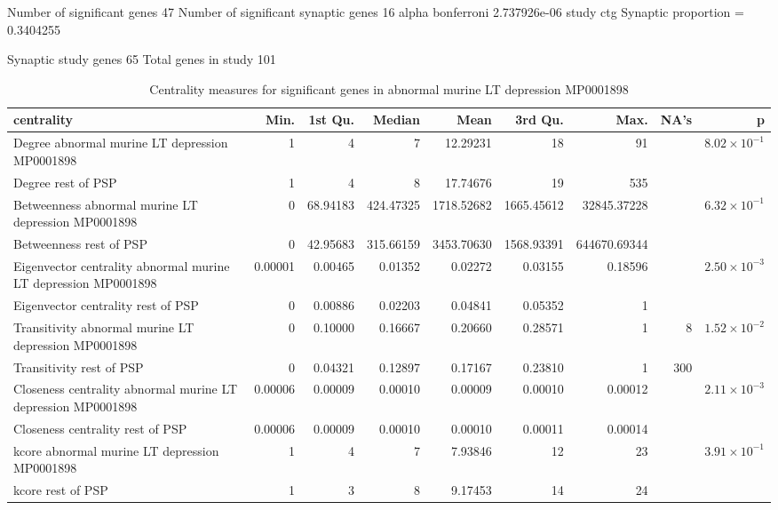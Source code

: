 Number of significant genes 47  
Number of significant synaptic genes 16  
alpha bonferroni 2.737926e-06  
study  ctg 
Synaptic proportion =  0.3404255 

Synaptic study genes  65
Total genes in study 101%
\begin{table}[ht]
\centering
\begin{adjustbox}{width=\textwidth}

\begin{tabular}{lrrrrrrrr}
  \hline
centrality & Min. & 1st Qu. & Median & Mean & 3rd Qu. & Max. & NA's & p \\ 
  \hline
Degree abnormal murine LT depression MP0001898 & 1   & 4   & 7   & 12.29231 & 18   & 91   &  & $8.02 \times 10^{-1}$ \\ 
  Degree rest of PSP & 1   & 4   & 8   & 17.74676 & 19   & 535   &  &  \\ 
  Betweenness abnormal murine LT depression MP0001898 & 0   & 68.94183 & 424.47325 & 1718.52682 & 1665.45612 & 32845.37228 &  & $6.32 \times 10^{-1}$ \\ 
  Betweenness rest of PSP & 0   & 42.95683 & 315.66159 & 3453.70630 & 1568.93391 & 644670.69344 &  &     \\ 
  Eigenvector centrality abnormal murine LT depression MP0001898 & 0.00001 & 0.00465 & 0.01352 & 0.02272 & 0.03155 & 0.18596 &  & $2.50 \times 10^{-3}$ \\ 
  Eigenvector centrality rest of PSP & 0   & 0.00886 & 0.02203 & 0.04841 & 0.05352 & 1   &  &     \\ 
  Transitivity abnormal murine LT depression MP0001898 & 0   & 0.10000 & 0.16667 & 0.20660 & 0.28571 & 1   & 8 & $1.52 \times 10^{-2}$ \\ 
  Transitivity rest of PSP & 0   & 0.04321 & 0.12897 & 0.17167 & 0.23810 & 1   & 300 &     \\ 
  Closeness centrality abnormal murine LT depression MP0001898 & 0.00006 & 0.00009 & 0.00010 & 0.00009 & 0.00010 & 0.00012 &  & $2.11 \times 10^{-3}$ \\ 
  Closeness centrality rest of PSP & 0.00006 & 0.00009 & 0.00010 & 0.00010 & 0.00011 & 0.00014 &  &     \\ 
  kcore abnormal murine LT depression MP0001898 & 1   & 4   & 7   & 7.93846 & 12   & 23   &  & $3.91 \times 10^{-1}$ \\ 
  kcore rest of PSP & 1   & 3   & 8   & 9.17453 & 14   & 24   &  &     \\ 
   \hline
\end{tabular}
\end{adjustbox}
\caption{Centrality measures for significant genes in abnormal murine LT depression MP0001898} 
\label{tab:Centrality measures for significant genes in abnormal murine LT depression MP0001898}
\end{table}

